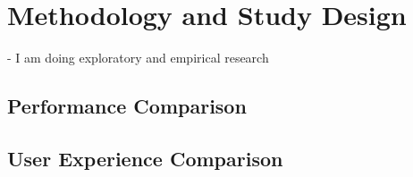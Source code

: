 \chapter{Methodology and Study Design}
- I am doing exploratory and empirical research

\section{Performance Comparison}

\section{User Experience Comparison}

